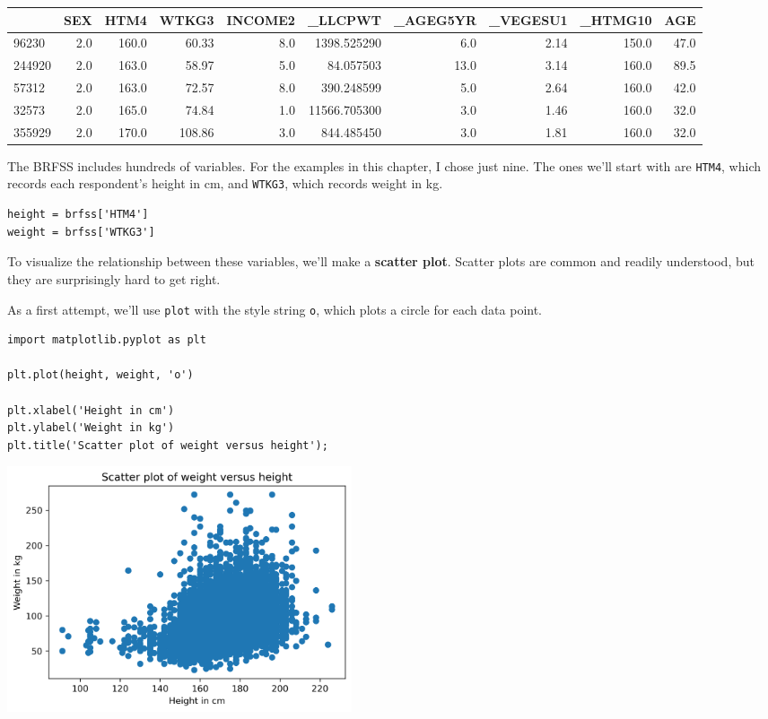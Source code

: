 \begin{tabular}{lrrrrrrrrr}
\midrule
{} &  SEX &   HTM4 &   WTKG3 &  INCOME2 &       \_LLCPWT &  \_AGEG5YR &  \_VEGESU1 &  \_HTMG10 &   AGE \\
\midrule
96230  &  2.0 &  160.0 &   60.33 &      8.0 &   1398.525290 &       6.0 &      2.14 &    150.0 &  47.0 \\
244920 &  2.0 &  163.0 &   58.97 &      5.0 &     84.057503 &      13.0 &      3.14 &    160.0 &  89.5 \\
57312  &  2.0 &  163.0 &   72.57 &      8.0 &    390.248599 &       5.0 &      2.64 &    160.0 &  42.0 \\
32573  &  2.0 &  165.0 &   74.84 &      1.0 &  11566.705300 &       3.0 &      1.46 &    160.0 &  32.0 \\
355929 &  2.0 &  170.0 &  108.86 &      3.0 &    844.485450 &       3.0 &      1.81 &    160.0 &  32.0 \\
\midrule
\end{tabular}

The BRFSS includes hundreds of variables. For the examples in this
chapter, I chose just nine. The ones we'll start with are
\passthrough{\lstinline!HTM4!}, which records each respondent's height
in cm, and \passthrough{\lstinline!WTKG3!}, which records weight in kg.

\begin{lstlisting}[]
height = brfss['HTM4']
weight = brfss['WTKG3']
\end{lstlisting}

To visualize the relationship between these variables, we'll make a
\textbf{scatter plot}. Scatter plots are common and readily understood,
but they are surprisingly hard to get right.

As a first attempt, we'll use \passthrough{\lstinline!plot!} with the
style string \passthrough{\lstinline!o!}, which plots a circle for each
data point.

\begin{lstlisting}[]
import matplotlib.pyplot as plt

plt.plot(height, weight, 'o')

plt.xlabel('Height in cm')
plt.ylabel('Weight in kg')
plt.title('Scatter plot of weight versus height');
\end{lstlisting}

\begin{center}
\includegraphics[width=4in]{09_relationships_files/09_relationships_13_0.png}
\end{center}

